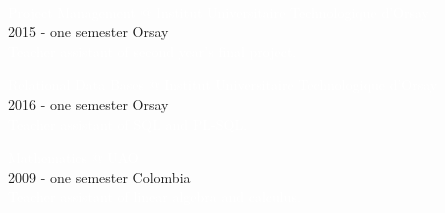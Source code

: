 \documentclass[letterpaper]{article}
\begin{document}
\begin{minipage}[t]{1\linewidth}
{\begin{minipage}[t]{0.47\linewidth}
\begin{minipage}{1\linewidth}
		\\
		\vspace{2ex}
		\begin{minipage}{0.9\linewidth}
			{\normalsize \textcolor{white}{Project Management @ Institut 
			Universitaire Technologique d'Orsay}}\\
			{\small\textcolor{gray!40}{2015 - one semester \hfill Orsay}}\\
			{\small\textcolor{white}{Teacher assistant of second year's final 
			project.}}\\			
		\end{minipage} 
		\begin{minipage}{0.9\linewidth}
			{\normalsize \textcolor{white}{Relational Data Bases @ Institut 
			Universitaire Technologique d'Orsay}}\\					
			{\small\textcolor{gray!40}{2016 - one semester \hfill Orsay}}\\
			{\small\textcolor{white}{Teacher assistant of SQL and 
			PL-SQL.}}\\			
		\end{minipage} 
		\begin{minipage}{0.9\linewidth}
			{\normalsize \textcolor{white}{Mathematics @ 
			UAO}}\\					
			{\small\textcolor{gray!40}{2009 - one semester \hfill Colombia}}\\
			{\small\textcolor{white}{Teacher assistant of linear algebra and 
			calculus.}}\\
			\vspace{1ex}
		\end{minipage} 
	\end{minipage} %
%
	\begin{minipage}{1\linewidth}
		\begin{minipage}{1\linewidth}
			\\
			\vspace{2ex}
		\end{minipage}
		\textcolor{white}{\normalsize
		\begin{minipage}{1\linewidth}

\end{minipage}}
\end{minipage}
\end{minipage}}
\end{minipage}
\end{document}
